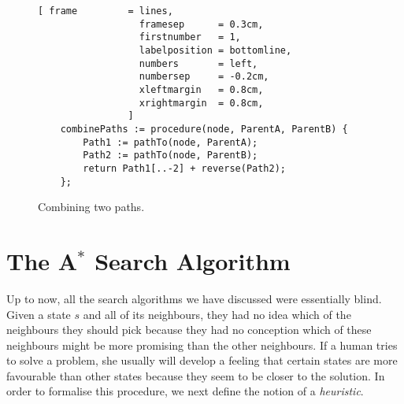 \begin{figure}[!ht]
\centering
\begin{Verbatim}[ frame         = lines, 
                  framesep      = 0.3cm, 
                  firstnumber   = 1,
                  labelposition = bottomline,
                  numbers       = left,
                  numbersep     = -0.2cm,
                  xleftmargin   = 0.8cm,
                  xrightmargin  = 0.8cm,
                ]
    combinePaths := procedure(node, ParentA, ParentB) {
        Path1 := pathTo(node, ParentA);
        Path2 := pathTo(node, ParentB);
        return Path1[..-2] + reverse(Path2);
    };
\end{Verbatim}
\vspace*{-0.3cm}
\caption{Combining two paths.}
\label{fig:combine-paths.stlx}
\end{figure}


\section{The A$^*$ Search Algorithm}
Up to now, all the search algorithms we have discussed were essentially blind.  Given a state $s$ and
all of its neighbours, they had no idea which of the neighbours they should pick because they had no conception
which of these neighbours might be more promising than the other neighbours.  If a human tries to solve a
problem, she usually will develop a feeling that certain states are more favourable than other states because
they seem to be closer to the solution.  In order to formalise this procedure, we next define the notion of a 
\emph{\color{blue}heuristic}.

